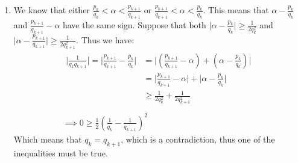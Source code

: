 \begin{enumerate}[label=]
   \item 
      We know that either $\frac{p_k}{q_k} < \alpha < \frac{p_{k + 1}}{q_{k + 1}}$ or $\frac{p_{k+1}}{q_{k + 1}} < \alpha < \frac{p_k}{q_k}$. This means that $\alpha - \frac{p_k}{q_k}$ and $\frac{p_{k + 1}}{q_{k + 1}} - \alpha$ have the same sign. Suppose that both $\big|\alpha - \frac{p_k}{q_k}\big| \ge \frac{1}{2q_k^2}$ and $\big|\alpha - \frac{p_{k + 1}}{q_{k + 1}}\big| \ge \frac{1}{2q_{k + 1}^2}$. Thus we have:
      \begin{gather*}
         \begin{split}
            \bigg|\frac{1}{q_k q_{k + 1}}\bigg| = \bigg| \frac{p_{k + 1}}{q_{k + 1}} - \frac{p_k}{q_k}  \bigg|  &= \bigg|(\frac{p_{k + 1}}{q_{k + 1}} - \alpha) + (\alpha - \frac{p_k}{q_k})\bigg|\\
            & = \bigg|\frac{p_{k + 1}}{q_{k + 1}} - \alpha \bigg| + \bigg|\alpha - \frac{p_k}{q_k}\bigg| \\
            & \ge \frac{1}{2q_k^2} + \frac{1}{2q_{k + 1}^2} \\
         \end{split} \\
         \implies 0 \ge \frac{1}{2} (\frac{1}{q_k} - \frac{1}{q_{k + 1}})^2
      \end{gather*}
      Which means that $q_k = q_{k + 1}$, which is a contradiction, thus one of the inequalities must be true.
\end{enumerate}